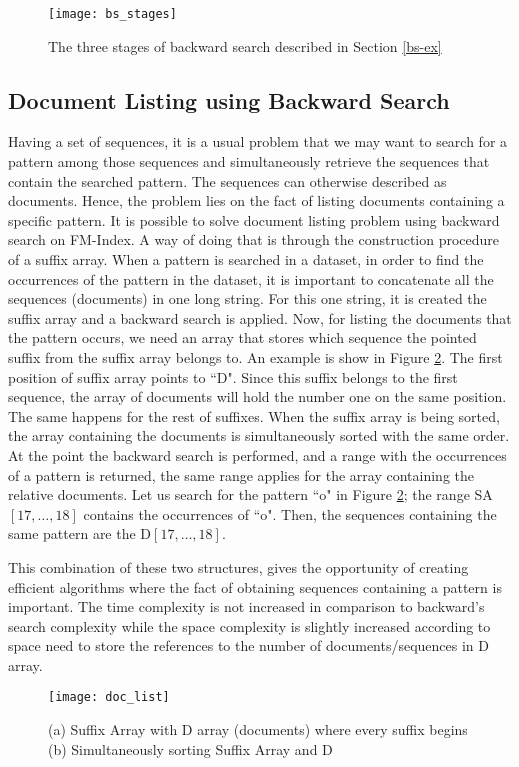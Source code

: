\begin{figure}[h]
    \centering
    \texttt{[image: bs\_stages]}
    \caption{The three stages of backward search described in Section \ref{bs-ex}}
    \label{fig:bs_stages}
\end{figure}

\subsection{Document Listing using Backward Search}{\label{App:bs_doclist}}
Having a set of sequences, it is a usual problem that we may want to search for a pattern among those sequences and simultaneously retrieve the sequences that contain the searched pattern. The sequences can otherwise described as documents. Hence, the problem lies on the fact of listing documents containing a specific pattern. It is possible to solve document listing problem using backward search on FM-Index. A way of doing that is through the construction procedure of a suffix array. When a pattern is searched in a dataset, in order to find the occurrences of the pattern in the dataset, it is important to concatenate all the sequences (documents) in one long string. For this one string, it is created the suffix array and a backward search is applied. Now, for listing the documents that the pattern occurs, we need an array that stores which sequence the pointed suffix from the suffix array belongs to. An example is show in Figure \ref{fig:doc_list}. The first position of suffix array points to ``D". Since this suffix belongs to the first sequence, the array of documents will hold the number one on the same position. The same happens for the rest of suffixes. When the suffix array is being sorted, the array containing the documents is simultaneously sorted with the same order. At the point the backward search is performed, and a range with the occurrences of a pattern is returned, the same range applies for the array containing the relative documents. Let us search for the pattern ``o" in Figure \ref{fig:doc_list}; the range SA$[17,\ldots,18]$ contains the occurrences of ``o". Then, the sequences containing the same pattern are the D$[17,\ldots,18]$. 
\par This combination of these two structures, gives the opportunity of creating efficient algorithms where the fact of obtaining sequences containing a pattern is important. The time complexity is not increased in comparison to backward's search complexity while the space complexity is slightly increased according to space need to store the references to the number of documents/sequences in D array.

\begin{figure}[h]
    \centering
    \texttt{[image: doc\_list]}
    \caption{(a) Suffix Array with D array (documents) where every suffix begins (b) Simultaneously sorting Suffix Array and D }
    \label{fig:doc_list}
\end{figure}



